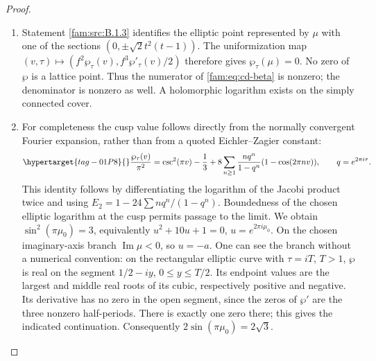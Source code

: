 \begin{proof}
\begin{enumerate}[label=\arabic*.,leftmargin=*]
\item Statement \ref{fam:src:B.1.3} identifies the elliptic point represented by \(\mu\) with
one of the sections \((0,\pm\sqrt2t^2(t-1))\). The uniformization map
\((v,\tau)\mapsto(f^2\wp_\tau(v),f^3\wp'_\tau(v)/2)\) therefore gives
\(\wp_\tau(\mu)=0\). No zero of \(\wp\) is a lattice point. Thus the numerator
of \eqref{fam:eq:cd-beta} is nonzero; the denominator is nonzero as well.
A holomorphic logarithm exists on the simply connected cover.

\item For completeness the cusp value follows directly from the normally
convergent Fourier expansion, rather than from a quoted Eichler--Zagier
constant:
\begin{equation}\hypertarget{tag-01P8}{}\label{fam:eq:cd-wp}
 \frac{\wp_\tau(v)}{\pi^2}
 =\csc^2(\pi v)-\frac13+
 8\sum_{n\geq1}\frac{nq^n}{1-q^n}(1-\cos(2\pi nv)),
 \qquad q=e^{2\pi i\tau}.
\end{equation}
This identity follows by differentiating the logarithm of the Jacobi
product twice and using
\(E_2=1-24\sum nq^n/(1-q^n)\). Boundedness of the chosen elliptic logarithm
at the cusp permits passage to the limit. We obtain
\(\sin^2(\pi\mu_0)=3\), equivalently
\(u^2+10u+1=0\), \(u=e^{2\pi i\mu_0}\).
On the chosen imaginary-axis branch \(\operatorname{Im}\mu<0\), so \(u=-a\).
One can see the branch without a numerical convention: on the rectangular
elliptic curve with \(\tau=iT\), \(T>1\), \(\wp\) is real on the segment
\(1/2-iy\), \(0\leq y\leq T/2\). Its endpoint values are the largest and
middle real roots of its cubic, respectively positive and negative.
Its derivative has no zero in the open segment, since the zeros of
\(\wp'\) are the three nonzero half-periods. There is exactly one zero
there; this gives the indicated continuation. Consequently
\(2\sin(\pi\mu_0)=2\sqrt3\).


\end{enumerate}
\end{proof}
